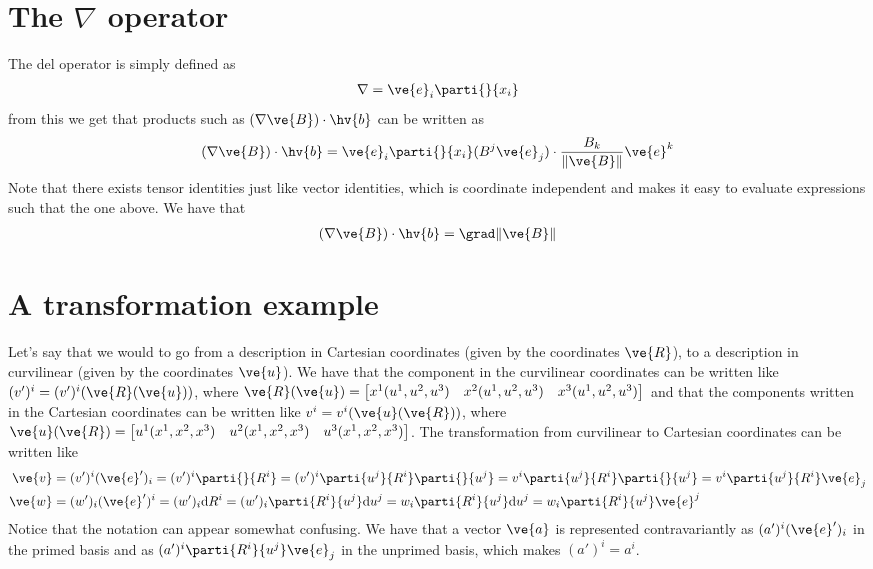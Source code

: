 \documentclass[a4paper, 12pt]{article}
\begin{document}
\section{The $\nabla$ operator}
The del operator is simply defined as
%
\begin{align*}
 \nabla = \ve{e}_i \parti{}{x_i}
\end{align*}
%
from this we get that products such as $(\nabla \ve{B}) \cdot \hv{b}$ can be 
written as
%
\begin{align*}
 (\nabla \ve{B}) \cdot \hv{b} = 
 \ve{e}_i \parti{}{x_i} (B^j \ve{e}_j) \cdot \frac{B_k}{\|\ve{B}\|}\ve{e}^k
\end{align*}
%
Note that there exists tensor identities just like vector identities, which is 
coordinate independent and makes it easy to evaluate expressions such that the 
one above. We have that
%
\begin{align*}
 (\nabla \ve{B}) \cdot \hv{b} = \grad \|\ve{B}\|
\end{align*}




\section{A transformation example}
Let's say that we would to go from a description in Cartesian coordinates 
(given by the coordinates $\ve{R}$), to a description in curvilinear (given by 
the coordinates $\ve{u}$). We have that the component in the curvilinear 
coordinates can be written like $(v')^i = 
(v')^i(\ve{R}(\ve{u}))$, where 
$\ve{R}(\ve{u}) =
 \begin{bmatrix}
  x^1(u^1,u^2,u^3)& 
  x^2(u^1,u^2,u^3)&
  x^3(u^1,u^2,u^3)
 \end{bmatrix}
$
and that the components written in the Cartesian coordinates can be written like
$v^i = 
v^i(\ve{u}(\ve{R}))$, where 
$\ve{u}(\ve{R}) =
 \begin{bmatrix}
  u^1(x^1,x^2,x^3)& 
  u^2(x^1,x^2,x^3)&
  u^3(x^1,x^2,x^3)
 \end{bmatrix}
$. The transformation from curvilinear to Cartesian coordinates can be written 
like
%
\begin{align*}
 \ve{v} &=
 (v')^i(\ve{e}')_i =
 (v')^i\parti{}{R^i} = 
 (v')^i \parti{u^j}{R^i}\parti{}{u^j} =
 v^i \parti{u^j}{R^i}\parti{}{u^j} =
 v^i \parti{u^j}{R^i}\ve{e}_j
 \\
 \ve{w} &=
 (w')_i(\ve{e}')^i = 
 (w')_i\text{d}R^i = 
 (w')_i \parti{R^i}{u^j}\text{d}u^j =
 w_i \parti{R^i}{u^j}\text{d}u^j =
 w_i \parti{R^i}{u^j}\ve{e}^j
\end{align*}
%
Notice that the notation can appear somewhat confusing. We have that a 
vector $\ve{a}$ is represented contravariantly as $(a')^i(\ve{e}')_i$ in the 
primed basis and as $(a')^i \parti{R^i}{u^j} \ve{e}_j$ in the unprimed 
basis, which makes $(a')^i = a^i$. 
\end{document}
